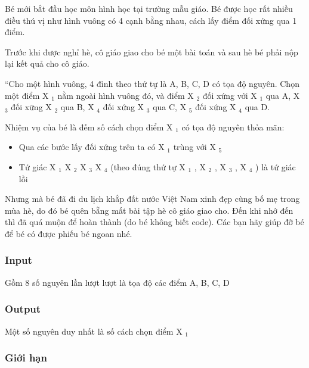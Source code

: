 





   Bé mới bắt đầu học môn hình học tại trường mẫu giáo. Bé được học rất nhiều điều thú vị như hình vuông có 4 cạnh bằng nhau, cách lấy điểm đối xứng qua 1 điểm.  

   Trước khi được nghỉ hè, cô giáo giao cho bé một bài toán và sau hè bé phải nộp lại kết quả cho cô giáo.  

   “Cho một hình vuông, 4 đỉnh theo thứ tự là A, B, C, D có tọa độ nguyên. Chọn một điểm X   $_    1   $   nằm ngoài hình vuông đó, và điểm X   $_    2   $   đối xứng với X   $_    1   $   qua A, X   $_    3   $   đối xững X   $_    2   $   qua B, X   $_    4   $   đối xứng X   $_    3   $   qua C, X   $_    5   $   đối xứng X   $_    4   $   qua D.  

   Nhiệm vụ của bé là đếm số cách chọn điểm X   $_    1   $   có tọa độ nguyên thỏa mãn:  
\begin{itemize}
	\item     Qua các bước lấy đối xứng trên ta có X    $_     1    $    trùng với X    $_     5    $
	\item     Tứ giác X    $_     1    $    X    $_     2    $    X    $_     3    $    X    $_     4    $    (theo đúng thứ tự X    $_     1    $    , X    $_     2    $    , X    $_     3    $    , X    $_     4    $    ) là tứ giác lồi   
\end{itemize}

   Nhưng mà bé đã đi du lịch khắp đất nước Việt Nam xinh đẹp cùng bố mẹ trong mùa hè, do đó bé quên bẵng mất bài tập hè cô giáo giao cho. Đến khi nhớ đến thì đã quá muộn để hoàn thành (do bé không biết code). Các bạn hãy giúp đỡ bé để bé có được phiếu bé ngoan nhé.  

\subsubsection{   Input  }

   Gồm 8 số nguyên lần lượt lượt là tọa độ các điểm A, B, C, D  

\subsubsection{   Output  }

   Một số nguyên duy nhất là số cách chọn điểm X   $_    1   $

\subsubsection{   Giới hạn  }

